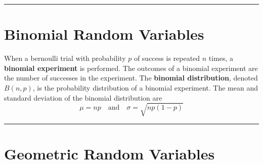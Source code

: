 \documentclass{article}
\theoremstyle{definition}
\newcommand{\secend}[0]{\noindent\rule[0.5ex]{\linewidth}{1pt}}
\newcommand{\mand}[0]{\quad\text{and}\quad}
\begin{document}
\secend

\section*{Binomial Random Variables}
\begin{definition}
    When a bernoulli trial with probability $p$ of success is repeated $n$ 
    times, a \textbf{binomial experiment} is performed. The outcomes of a 
    binomial experiment are the number of successes in the experiment. 
    \tcblower
    The \textbf{binomial distribution}, denoted $B(n,p)$, is the probability
    distribution of a binomial experiment. The mean and standard deviation of
    the binomial distribution are
    \[
        \mu = np \mand \sigma = \sqrt{np(1-p)}
    \]
\end{definition}

\secend

\section*{Geometric Random Variables}
\begin{definition}
    
\end{definition}
\end{document}
